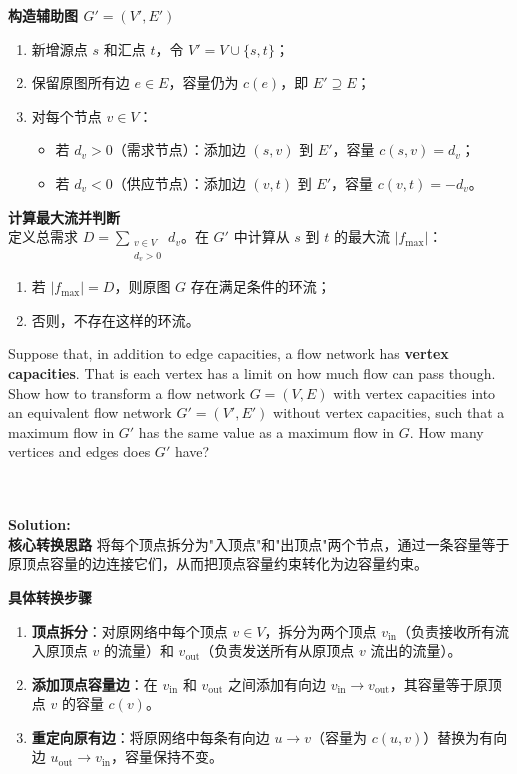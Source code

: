 \documentclass{article}
\newcounter{exercise}
\newcommand{\<}{
    \langle}
\renewcommand{\>}{
    \rangle}
\begin{document}
{\noindent\textbf{构造辅助图 \( G'=(V', E') \)}
\begin{enumerate}
    \item 新增源点 \( s \) 和汇点 \( t \)，令 \( V' = V \cup \{s, t\} \)；
    \item 保留原图所有边 \( e \in E \)，容量仍为 \( c(e) \)，即 \( E' \supseteq E \)；
    \item 对每个节点 \( v \in V \)：
        \begin{itemize}
            \item 若 \( d_v > 0 \)（需求节点）：添加边 \( (s, v) \) 到 \( E' \)，容量 \( c(s, v) = d_v \)；
            \item 若 \( d_v < 0 \)（供应节点）：添加边 \( (v, t) \) 到 \( E' \)，容量 \( c(v, t) = -d_v \)。
        \end{itemize}
\end{enumerate}

\noindent\textbf{计算最大流并判断}\\
定义总需求 \( D = \sum_{\substack{v \in V \\ d_v > 0}} d_v \)。在 \( G' \) 中计算从 \( s \) 到 \( t \) 的最大流 \( |f_{\text{max}}| \)：
\begin{enumerate}
    \item 若 \( |f_{\text{max}}| = D \)，则原图 \( G \) 存在满足条件的环流；
    \item 否则，不存在这样的环流。
\end{enumerate}

\begin{exercise}
Suppose that, in addition to edge capacities, a flow network has \textbf{vertex capacities}.
That is each vertex has a limit on how much flow can pass though. Show how to transform a flow network $G=(V,E)$ with vertex capacities into an equivalent flow network $G'=(V',E')$ without vertex capacities, such that a maximum flow in $G'$ has the same value as a maximum flow in $G$. How many vertices and edges does $G'$ have?
\end{exercise}
\\\\
\noindent\textbf{Solution:}
\\
\noindent\textbf{核心转换思路}
将每个顶点拆分为"入顶点"和"出顶点"两个节点，通过一条容量等于原顶点容量的边连接它们，从而把顶点容量约束转化为边容量约束。

\noindent\textbf{具体转换步骤}
\begin{enumerate}
    \item \textbf{顶点拆分}：对原网络中每个顶点 $v \in V$，拆分为两个顶点 $v_{\text{in}}$（负责接收所有流入原顶点 $v$ 的流量）和 $v_{\text{out}}$（负责发送所有从原顶点 $v$ 流出的流量）。
    \item \textbf{添加顶点容量边}：在 $v_{\text{in}}$ 和 $v_{\text{out}}$ 之间添加有向边 $v_{\text{in}} \to v_{\text{out}}$，其容量等于原顶点 $v$ 的容量 $c(v)$。
    \item \textbf{重定向原有边}：将原网络中每条有向边 $u \to v$（容量为 $c(u,v)$）替换为有向边 $u_{\text{out}} \to v_{\text{in}}$，容量保持不变。
\end{enumerate}

}
\end{document}
